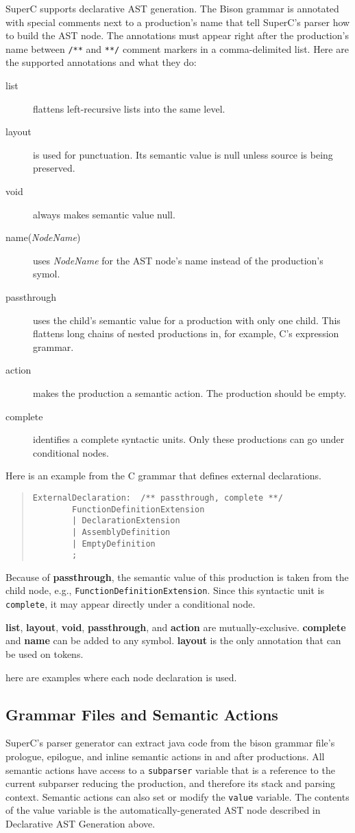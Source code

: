 \documentclass{article}
\begin{document}
SuperC supports declarative AST generation.  The Bison grammar is
annotated with special comments next to a production's name that tell
SuperC's parser how to build the AST node.  The annotations must
appear right after the production's name between \verb'/**' and
\verb'**/' comment markers in a comma-delimited list.  Here are the
supported annotations and what they do:
\begin{description}
\item[list] flattens left-recursive lists into the same level.
\item[layout] is used for punctuation.  Its semantic value is null
  unless source is being preserved.
\item[void] always makes semantic value null.
\item[name(\textit{NodeName})] uses \textit{NodeName} for the AST
  node's name instead of the production's symol.
\item[passthrough] uses the child's semantic value for a production
  with only one child.  This flattens long chains of nested
  productions in, for example, C's expression grammar.
\item[action] makes the production a semantic action.  The production
  should be empty.
\item[complete] identifies a complete syntactic units.  Only these
  productions can go under conditional nodes.
\end{description}
Here is an example from the C grammar that defines external
declarations.
\begin{quote}
\begin{verbatim}
ExternalDeclaration:  /** passthrough, complete **/
        FunctionDefinitionExtension
        | DeclarationExtension
        | AssemblyDefinition
        | EmptyDefinition
        ;
\end{verbatim}
\end{quote}
Because of \textbf{passthrough}, the semantic value of this production
is taken from the child node, e.g.,
\verb'FunctionDefinitionExtension'.  Since this syntactic unit is
\verb'complete', it may appear directly under a conditional node.

\textbf{list}, \textbf{layout}, \textbf{void}, \textbf{passthrough},
and \textbf{action} are mutually-exclusive.  \textbf{complete} and
\textbf{name} can be added to any symbol.  \textbf{layout} is the only
annotation that can be used on tokens.

here are examples where each node declaration is used.

\subsection{Grammar Files and Semantic Actions}

SuperC's parser generator can extract java code from the bison grammar
file's prologue, epilogue, and inline semantic actions in and after
productions.  All semantic actions have access to a \texttt{subparser}
variable that is a reference to the current subparser reducing the
production, and therefore its stack and parsing context.  Semantic
actions can also set or modify the \texttt{value} variable.  The
contents of the value variable is the automatically-generated AST node
described in Declarative AST Generation above.
\end{document}
